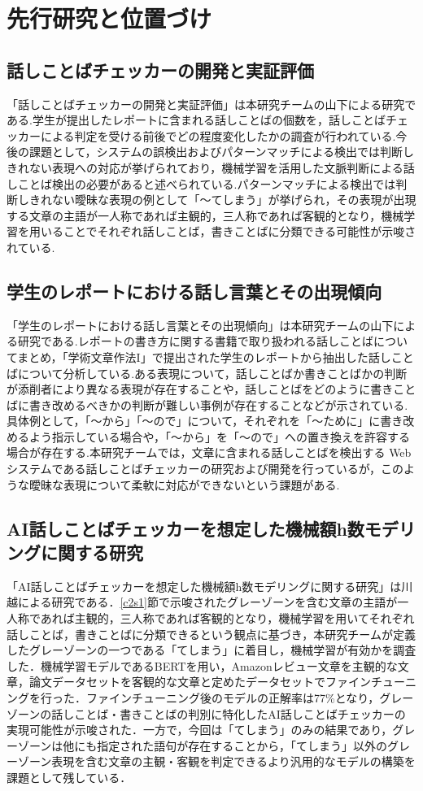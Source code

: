 \chapter{先行研究と位置づけ\label{c2}}

\section{話しことばチェッカーの開発と実証評価 \label{c2s1}}
「話しことばチェッカーの開発と実証評価」は本研究チームの山下による研究である.学生が提出したレポートに含まれる話しことばの個数を，話しことばチェッカーによる判定を受ける前後でどの程度変化したかの調査が行われている.今後の課題として，システムの誤検出およびパターンマッチによる検出では判断しきれない表現への対応が挙げられており，機械学習を活用した文脈判断による話しことば検出の必要があると述べられている.パターンマッチによる検出では判断しきれない曖昧な表現の例として「～てしまう」が挙げられ，その表現が出現する文章の主語が一人称であれば主観的，三人称であれば客観的となり，機械学習を用いることでそれぞれ話しことば，書きことばに分類できる可能性が示唆されている.

\section{学生のレポートにおける話し言葉とその出現傾向 \label{c2s2}}
「学生のレポートにおける話し言葉とその出現傾向」は本研究チームの山下による研究である.レポートの書き方に関する書籍で取り扱われる話しことばについてまとめ，「学術文章作法I」で提出された学生のレポートから抽出した話しことばについて分析している.ある表現について，話しことばか書きことばかの判断が添削者により異なる表現が存在することや，話しことばをどのように書きことばに書き改めるべきかの判断が難しい事例が存在することなどが示されている.具体例として，「～から」「～ので」について，それぞれを「～ために」に書き改めるよう指示している場合や，「～から」を「～ので」への置き換えを許容する場合が存在する.本研究チームでは，文章に含まれる話しことばを検出する Web システムである話しことばチェッカーの研究および開発を行っているが，このような曖昧な表現について柔軟に対応ができないという課題がある.

\section{AI話しことばチェッカーを想定した機械額h数モデリングに関する研究 \label{c2s3}}
「AI話しことばチェッカーを想定した機械額h数モデリングに関する研究」\cite{ai-checker}は川越による研究である．\ref{c2s1}節で示唆されたグレーゾーンを含む文章の主語が一人称であれば主観的，三人称であれば客観的となり，機械学習を用いてそれぞれ話しことば，書きことばに分類できるという観点に基づき，本研究チームが定義したグレーゾーンの一つである「てしまう」に着目し，機械学習が有効かを調査した．機械学習モデルであるBERTを用い，Amazonレビュー文章を主観的な文章，論文データセットを客観的な文章と定めたデータセットでファインチューニングを行った．ファインチューニング後のモデルの正解率は77\%となり，グレーゾーンの話しことば・書きことばの判別に特化したAI話しことばチェッカーの実現可能性が示唆された．一方で，今回は「てしまう」のみの結果であり，グレーゾーンは他にも指定された語句が存在することから，「てしまう」以外のグレーゾーン表現を含む文章の主観・客観を判定できるより汎用的なモデルの構築を課題として残している．

